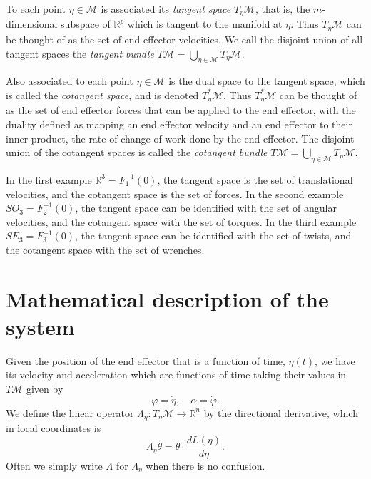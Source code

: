 \documentclass[reqno,twocolumn]{amsart}
\renewcommand{\mathsf}{}
\begin{document}
To each point $\eta \in \mathcal M$ is associated its \emph{tangent space} $T_\eta \mathcal M$, that is, the $m$-dimensional subspace of $\mathbb R^p$ which is tangent to the manifold at $\eta$.  Thus $T_\eta \mathcal M$ can be thought of as the set of end effector velocities.  We call the disjoint union of all tangent spaces the \emph{tangent bundle} $T\mathcal M = \bigcup_{\eta \in \mathcal M} T_\eta \mathcal M$.

Also associated to each point $\eta \in \mathcal M$ is the dual space to the tangent space, which is called the \emph{cotangent space}, and is denoted $T^*_\eta\mathcal M$.  Thus $T^*_\eta\mathcal M$ can be thought of as the set of end effector forces that can be applied to the end effector, with the duality defined as mapping an end effector velocity and an end effector to their inner product, the rate of change of work done by the end effector.  The disjoint union of the cotangent spaces is called the \emph{cotangent bundle} $T\mathcal M = \bigcup_{\eta \in \mathcal M} T_\eta \mathcal M$.

In the first example $\mathbb R^3 = F_1^{-1}(0)$, the tangent space is the set of translational velocities, and the cotangent space is the set of forces.  In the second example $SO_3 = F_2^{-1}(0)$, the tangent space can be identified with the set of angular velocities, and the cotangent space with the set of torques.  In the third example $SE_3 = F_3^{-1}(0)$, the tangent space can be identified with the set of twists, and the cotangent space with the set of wrenches.

\section{Mathematical description of the system}

Given the position of the end effector that is a function of time, $\eta(t)$, we have its velocity and acceleration which are functions of time taking their values in $T\mathcal M$ given by
\begin{equation}
\varphi = \dot \eta, \quad
\alpha = \dot \varphi .
\end{equation}
We define the linear operator $\mathsf \Lambda_\eta:T_\eta\mathcal M \to \mathbb R^n$ by the directional derivative, which in local coordinates is
\begin{equation}
\mathsf \Lambda_\eta \theta = \theta \cdot \frac {d \mathsf L(\eta)}{d\eta} .
\end{equation}
Often we simply write $\Lambda$ for $\Lambda_\eta$ when there is no confusion.
\end{document}
